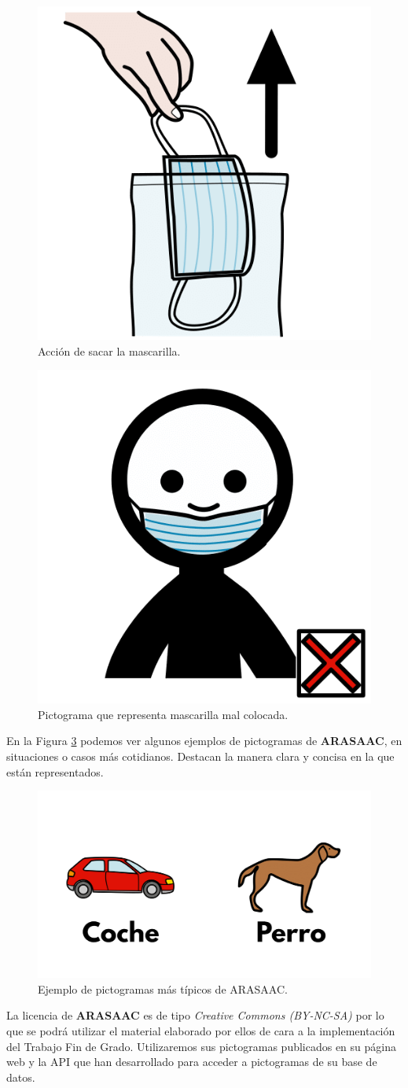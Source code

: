 \newpage
\begin{figure}[h!]
	\centering
	\includegraphics[width=0.2\linewidth]{Imagenes/Bitmap/Picto Mascarilla}
	\caption{Acción de sacar la mascarilla.}
	\label{fig:picto-mascarilla}
\end{figure}

\begin{figure}[h!]
	\centering
	\includegraphics[width=0.2\linewidth]{Imagenes/Bitmap/Mascarilla mal colocada}
	\caption{Pictograma que representa mascarilla mal colocada.}
	\label{fig:picto-mascarilla-mal-colocada}
\end{figure}

En la Figura \ref{fig:arasaacpictos} podemos ver algunos ejemplos de pictogramas de \textbf{ARASAAC}, en situaciones o casos más cotidianos. Destacan la manera clara y concisa en la que están representados. 

\begin{figure}[h!]
	\centering
	\includegraphics[width=0.7\linewidth]{Imagenes/Bitmap/ARASAACPictos}
	\caption{Ejemplo de pictogramas más típicos de ARASAAC.}
	\label{fig:arasaacpictos}
\end{figure}

La licencia de \textbf{ARASAAC} es de tipo \textit{Creative Commons (BY-NC-SA)} por lo que se podrá utilizar el material elaborado por ellos de cara a la implementación del Trabajo Fin de Grado. Utilizaremos sus pictogramas publicados en su página web y la API que han desarrollado para acceder a pictogramas de su base de datos.

